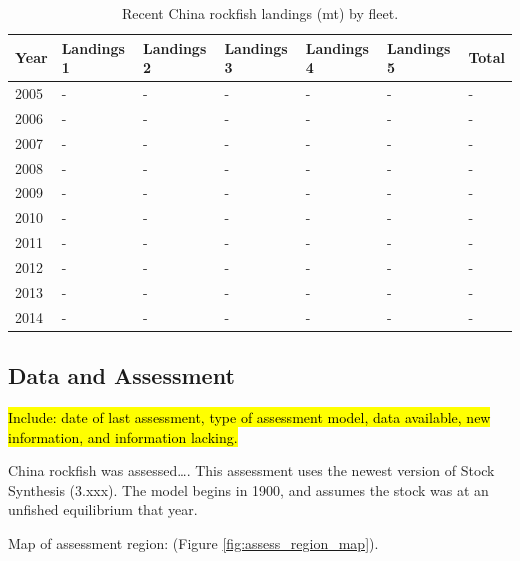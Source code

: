 \documentclass[12pt,]{article}
\begin{document}
\begin{table}[ht]
\centering
\caption{Recent China rockfish landings (mt) by 
                                            fleet.} 
\label{tab:Exec_catch}
\begin{tabular}{l>{\centering}p{1in}>{\centering}p{1in}>{\centering}p{1in}>{\centering}p{.9in}>{\centering}p{.9in}>{\centering}p{.6in}}
  \hline
Year & Landings 1 & Landings 2 & Landings 3 & Landings 4 & Landings 5 & Total \\ 
  \hline
2005 & - & - & - & - & - & - \\ 
  2006 & - & - & - & - & - & - \\ 
  2007 & - & - & - & - & - & - \\ 
  2008 & - & - & - & - & - & - \\ 
  2009 & - & - & - & - & - & - \\ 
  2010 & - & - & - & - & - & - \\ 
  2011 & - & - & - & - & - & - \\ 
  2012 & - & - & - & - & - & - \\ 
  2013 & - & - & - & - & - & - \\ 
  2014 & - & - & - & - & - & - \\ 
   \hline
\end{tabular}
\end{table}

\FloatBarrier

\newpage

\subsection*{Data and Assessment}\label{data-and-assessment}

\hl{Include: date of last assessment, type of assessment model, data available, new 
information, and information lacking.}

China rockfish was assessed\ldots{}. This assessment uses the newest
version of Stock Synthesis (3.xxx). The model begins in 1900, and
assumes the stock was at an unfished equilibrium that year.

Map of assessment region: (Figure \ref{fig:assess_region_map}).
\end{document}
